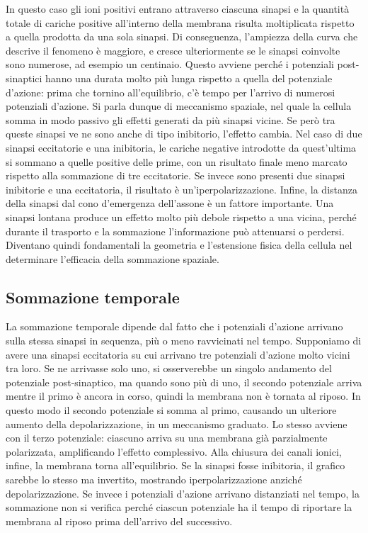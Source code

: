 In questo caso gli ioni positivi entrano attraverso ciascuna sinapsi e la quantità totale di cariche positive all’interno della membrana risulta moltiplicata rispetto a quella prodotta da una sola sinapsi. Di conseguenza, l’ampiezza della curva che descrive il fenomeno è maggiore, e cresce ulteriormente se le sinapsi coinvolte sono numerose, ad esempio un centinaio. Questo avviene perché i potenziali post-sinaptici hanno una durata molto più lunga rispetto a quella del potenziale d’azione: prima che tornino all’equilibrio, c’è tempo per l’arrivo di numerosi potenziali d’azione. Si parla dunque di meccanismo spaziale, nel quale la cellula somma in modo passivo gli effetti generati da più sinapsi vicine.
Se però tra queste sinapsi ve ne sono anche di tipo inibitorio, l’effetto cambia. Nel caso di due sinapsi eccitatorie e una inibitoria, le cariche negative introdotte da quest’ultima si sommano a quelle positive delle prime, con un risultato finale meno marcato rispetto alla sommazione di tre eccitatorie. Se invece sono presenti due sinapsi inibitorie e una eccitatoria, il risultato è un’iperpolarizzazione.
Infine, la distanza della sinapsi dal cono d’emergenza dell’assone è un fattore importante. Una sinapsi lontana produce un effetto molto più debole rispetto a una vicina, perché durante il trasporto e la sommazione l’informazione può attenuarsi o perdersi. Diventano quindi fondamentali la geometria e l’estensione fisica della cellula nel determinare l’efficacia della sommazione spaziale.

\subsection*{Sommazione temporale}

La sommazione temporale dipende dal fatto che i potenziali d’azione arrivano sulla stessa sinapsi in sequenza, più o meno ravvicinati nel tempo.
Supponiamo di avere una sinapsi eccitatoria su cui arrivano tre potenziali d’azione molto vicini tra loro. Se ne arrivasse solo uno, si osserverebbe un singolo andamento del potenziale post-sinaptico, ma quando sono più di uno, il secondo potenziale arriva mentre il primo è ancora in corso, quindi la membrana non è tornata al riposo. In questo modo il secondo potenziale si somma al primo, causando un ulteriore aumento della depolarizzazione, in un meccanismo graduato. Lo stesso avviene con il terzo potenziale: ciascuno arriva su una membrana già parzialmente polarizzata, amplificando l’effetto complessivo. Alla chiusura dei canali ionici, infine, la membrana torna all’equilibrio.
Se la sinapsi fosse inibitoria, il grafico sarebbe lo stesso ma invertito, mostrando iperpolarizzazione anziché depolarizzazione. Se invece i potenziali d’azione arrivano distanziati nel tempo, la sommazione non si verifica perché ciascun potenziale ha il tempo di riportare la membrana al riposo prima dell’arrivo del successivo.

